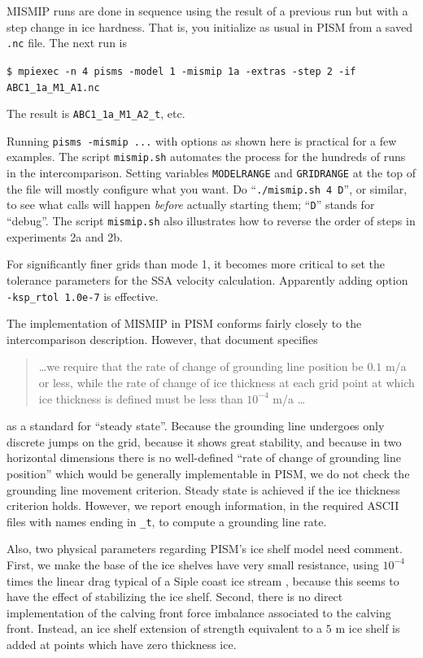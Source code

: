 \documentclass[11pt,final]{amsart}
\begin{document}
MISMIP runs are done in sequence using the result of a previous run but with a step change in ice hardness.  That is, you initialize as usual in PISM from a saved \verb|.nc| file.  The next run is

\verb|$ mpiexec -n 4 pisms -model 1 -mismip 1a -extras -step 2 -if ABC1_1a_M1_A1.nc|

\noindent The result is \verb|ABC1_1a_M1_A2_t|, etc.

Running \verb|pisms -mismip ...| with options as shown here is practical for a few examples.  The script \verb|mismip.sh| automates the process for the hundreds of runs in the intercomparison.  Setting variables \verb|MODELRANGE| and \verb|GRIDRANGE| at the top of the file will mostly configure what you want.  Do ``\verb|./mismip.sh 4 D|'', or similar, to see what calls will happen \emph{before} actually starting them; ``\verb|D|'' stands for ``debug''.  The script \verb|mismip.sh| also illustrates how to reverse the order of steps in experiments 2a and 2b.

For significantly finer grids than mode 1, it becomes more critical to set the tolerance parameters for the SSA velocity calculation.  Apparently adding option \verb|-ksp_rtol 1.0e-7| is effective.

The implementation of MISMIP in PISM conforms fairly closely to the intercomparison description.  However, that document specifies
\begin{quotation}
\dots we require that the rate of change of grounding line position be $0.1$ m/a or less, while the rate of change of ice thickness at each grid point at which ice thickness is defined must be less than $10^{-4}$ m/a \dots
\end{quotation}
as a standard for ``steady state''.  Because the grounding line undergoes only discrete jumps on the grid, because it shows great stability, and because in two horizontal dimensions there is no well-defined ``rate of change of grounding line position'' which would be generally implementable in PISM, we do not check the grounding line movement criterion.  Steady state is achieved if the ice thickness criterion holds.  However, we report enough information, in the required ASCII files with names ending in \verb|_t|, to compute a grounding line rate.

Also, two physical parameters regarding PISM's ice shelf model need comment.  First, we make the base of the ice shelves have very small resistance, using $10^{-4}$ times the linear drag typical of a Siple coast ice stream \cite{HulbeMacAyeal}, because this seems to have the effect of stabilizing the ice shelf.  Second, there is no direct implementation of the calving front force imbalance associated to the calving front.  Instead, an ice shelf extension of strength equivalent to a $5$ m ice shelf is added at points which have zero thickness ice.
\end{document}
